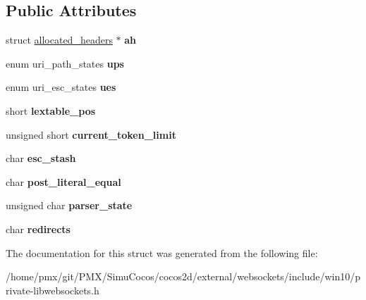 \subsection*{Public Attributes}
\begin{DoxyCompactItemize}
\item 
\mbox{\label{struct__lws__header__related_a7f7d2497436dfdbb3c8672bd1dece8a7}} 
struct \hyperlink{structallocated__headers}{allocated\+\_\+headers} $\ast$ {\bfseries ah}
\item 
\mbox{\label{struct__lws__header__related_a7e15a883c75ecfbe327d28ad08cf3cf9}} 
enum uri\+\_\+path\+\_\+states {\bfseries ups}
\item 
\mbox{\label{struct__lws__header__related_acd03d68ebc090ca06cafb70fa5470977}} 
enum uri\+\_\+esc\+\_\+states {\bfseries ues}
\item 
\mbox{\label{struct__lws__header__related_ac86a9ac8db1517fe26b676072d7c3f11}} 
short {\bfseries lextable\+\_\+pos}
\item 
\mbox{\label{struct__lws__header__related_ac84a993a406609a6f20639ddf0c61840}} 
unsigned short {\bfseries current\+\_\+token\+\_\+limit}
\item 
\mbox{\label{struct__lws__header__related_ab6e51acbb32ac92e4b911d7c922c2713}} 
char {\bfseries esc\+\_\+stash}
\item 
\mbox{\label{struct__lws__header__related_ada3e26a99473023fe1b3d840761ecc55}} 
char {\bfseries post\+\_\+literal\+\_\+equal}
\item 
\mbox{\label{struct__lws__header__related_ac55cae44e6af4e8122a8e4de38247ebd}} 
unsigned char {\bfseries parser\+\_\+state}
\item 
\mbox{\label{struct__lws__header__related_aa8c2cb123bf0c321370e99df9212b825}} 
char {\bfseries redirects}
\end{DoxyCompactItemize}


The documentation for this struct was generated from the following file\+:\begin{DoxyCompactItemize}
\item 
/home/pmx/git/\+P\+M\+X/\+Simu\+Cocos/cocos2d/external/websockets/include/win10/private-\/libwebsockets.\+h\end{DoxyCompactItemize}
